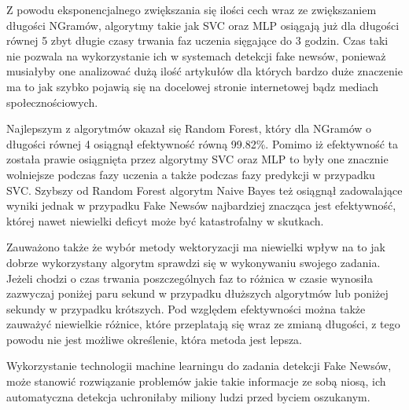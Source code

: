 Z powodu eksponencjalnego zwiększania się ilości cech wraz ze zwiększaniem długości NGramów, 
algorytmy takie jak SVC oraz MLP osiągają już dla długości równej 5 zbyt długie czasy trwania faz uczenia sięgające 
do 3 godzin. Czas taki nie pozwala na wykorzystanie ich w systemach detekcji fake newsów, ponieważ
musiałyby one analizować dużą ilość artykułów dla których bardzo duże znaczenie ma to jak 
szybko pojawią się na docelowej stronie internetowej bądz mediach społecznościowych.

Najlepszym z algorytmów okazał się Random Forest, który dla NGramów o długości równej 4
osiągnął efektywność równą 99.82\%. Pomimo iż efektywność ta została prawie osiągnięta przez algorytmy
SVC oraz MLP to były one znacznie wolniejsze podczas fazy uczenia a także podczas fazy 
predykcji w przypadku SVC. Szybszy od Random Forest algorytm Naive Bayes też osiągnął zadowalające wyniki
jednak w przypadku Fake Newsów najbardziej znacząca jest efektywność, której nawet niewielki deficyt
może być katastrofalny w skutkach.  

Zauważono także że wybór metody wektoryzacji ma niewielki wpływ na to jak dobrze wykorzystany algorytm 
sprawdzi się w wykonywaniu swojego zadania. Jeżeli chodzi o czas trwania poszczególnych faz to 
różnica w czasie wynosiła zazwyczaj poniżej paru sekund w przypadku dłuższych algorytmów lub poniżej 
sekundy w przypadku krótszych. Pod względem efektywności można także zauważyć niewielkie różnice,
które przeplatają się
wraz ze zmianą długości, z tego powodu nie jest możliwe określenie, która metoda jest lepsza.

Wykorzystanie technologii machine learningu do zadania detekcji Fake Newsów, 
może stanowić rozwiązanie problemów jakie takie informacje ze sobą niosą, ich automatyczna 
detekcja uchroniłaby miliony ludzi przed byciem oszukanym. 
